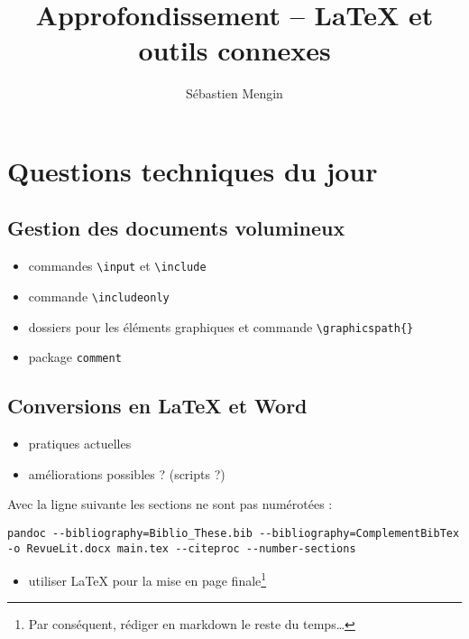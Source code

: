 \documentclass[
]{article}
\title{Approfondissement -- LaTeX et outils connexes}
\author{Sébastien Mengin}
\date{}
\providecommand{\tightlist}{%
  \setlength{\itemsep}{0pt}\setlength{\parskip}{0pt}}
\begin{document}
\maketitle

\hypertarget{questions-techniques-du-jour}{%
\section{Questions techniques du
jour}\label{questions-techniques-du-jour}}

\hypertarget{gestion-des-documents-volumineux}{%
\subsection{Gestion des documents
volumineux}\label{gestion-des-documents-volumineux}}

\begin{itemize}
\tightlist
\item
  commandes \texttt{\textbackslash{}input} et
  \texttt{\textbackslash{}include}
\item
  commande \texttt{\textbackslash{}includeonly}
\item
  dossiers pour les éléments graphiques et commande
  \texttt{\textbackslash{}graphicspath\{\}}
\item
  package \texttt{comment}
\end{itemize}

\hypertarget{conversions-en-latex-et-word}{%
\subsection{Conversions en LaTeX et
Word}\label{conversions-en-latex-et-word}}

\begin{itemize}
\tightlist
\item
  pratiques actuelles
\item
  améliorations possibles ? (scripts ?)
\end{itemize}

Avec la ligne suivante les sections ne sont pas numérotées :

\begin{verbatim}
pandoc --bibliography=Biblio_These.bib --bibliography=ComplementBibTex -o RevueLit.docx main.tex --citeproc --number-sections
\end{verbatim}

\begin{itemize}
\tightlist
\item
  utiliser LaTeX pour la mise en page finale\footnote{Par conséquent,
    rédiger en markdown le reste du temps\ldots{}}
\end{itemize}
\end{document}
